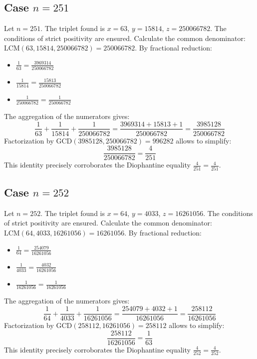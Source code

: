 \documentclass[11pt,a4paper]{article}
\begin{document}
\subsection{Case $n = 251$}
Let $n = 251$. The triplet found is $x = 63$, $y = 15814$, $z = 250066782$.
The conditions of strict positivity are ensured.
Calculate the common denominator: $\text{LCM}(63, 15814, 250066782) = 250066782$.
By fractional reduction:
\begin{itemize}
    \item $\frac{1}{63} = \frac{3969314}{250066782}$
    \item $\frac{1}{15814} = \frac{15813}{250066782}$
    \item $\frac{1}{250066782} = \frac{1}{250066782}$
\end{itemize}
The aggregation of the numerators gives:
$$ \frac{1}{63} + \frac{1}{15814} + \frac{1}{250066782} = \frac{3969314 + 15813 + 1}{250066782} = \frac{3985128}{250066782} $$
Factorization by $\text{GCD}(3985128, 250066782) = 996282$ allows to simplify:
$$ \frac{3985128}{250066782} = \frac{4}{251} $$
This identity precisely corroborates the Diophantine equality $\frac{4}{251} = \frac{4}{251}$.

\subsection{Case $n = 252$}
Let $n = 252$. The triplet found is $x = 64$, $y = 4033$, $z = 16261056$.
The conditions of strict positivity are ensured.
Calculate the common denominator: $\text{LCM}(64, 4033, 16261056) = 16261056$.
By fractional reduction:
\begin{itemize}
    \item $\frac{1}{64} = \frac{254079}{16261056}$
    \item $\frac{1}{4033} = \frac{4032}{16261056}$
    \item $\frac{1}{16261056} = \frac{1}{16261056}$
\end{itemize}
The aggregation of the numerators gives:
$$ \frac{1}{64} + \frac{1}{4033} + \frac{1}{16261056} = \frac{254079 + 4032 + 1}{16261056} = \frac{258112}{16261056} $$
Factorization by $\text{GCD}(258112, 16261056) = 258112$ allows to simplify:
$$ \frac{258112}{16261056} = \frac{1}{63} $$
This identity precisely corroborates the Diophantine equality $\frac{4}{252} = \frac{4}{252}$.
\end{document}
